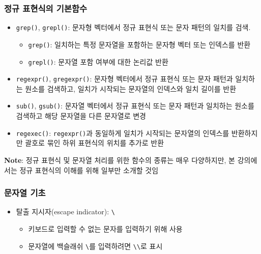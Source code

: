 \documentclass[
  11pt,
]{krantz}
\makeatletter
\providecommand{\tightlist}{%
  \setlength{\itemsep}{0pt}\setlength{\parskip}{0pt}}
\newenvironment{kframe}{%
\medskip{}
\setlength{\fboxsep}{.8em}
 \def\at@end@of@kframe{}%
 \ifinner\ifhmode%
  \def\at@end@of@kframe{\end{minipage}}%
  \begin{minipage}{\columnwidth}%
 \fi\fi%
 \def\FrameCommand##1{\hskip\@totalleftmargin \hskip-\fboxsep
 \colorbox{shadecolor}{##1}\hskip-\fboxsep
     \hskip-\linewidth \hskip-\@totalleftmargin \hskip\columnwidth}%
 \MakeFramed {\advance\hsize-\width
   \@totalleftmargin\z@ \linewidth\hsize
   \@setminipage}}%
 {\par\unskip\endMakeFramed%
 \at@end@of@kframe}
\renewenvironment{quote}{\begin{kframe}}{\end{kframe}}
\makeatother
\begin{document}
\hypertarget{regex-prim-fun}{%
\subsubsection*{정규 표현식의 기본함수}\label{regex-prim-fun}}


\begin{itemize}
\item
  \texttt{grep()}, \texttt{grepl()}: 문자형 벡터에서 정규 표현식 또는 문자 패턴의 일치를 검색.

  \begin{itemize}
  \tightlist
  \item
    \texttt{grep()}: 일치하는 특정 문자열을 포함하는 문자형 벡터 또는 인덱스를 반환
  \item
    \texttt{grepl()}: 문자열 포함 여부에 대한 논리값 반환
  \end{itemize}
\item
  \texttt{regexpr()}, \texttt{gregexpr()}: 문자형 벡터에서 정규 표현식 또는 문자 패턴과 일치하는 원소를 검색하고, 일치가 시작되는 문자열의 인덱스와 일치 길이를 반환
\item
  \texttt{sub()}, \texttt{gsub()}: 문자열 벡터에서 정규 표현식 또는 문자 패턴과 일치하는 원소를 검색하고 해당 문자열을 다른 문자열로 변경
\item
  \texttt{regexec()}: \texttt{regexpr()}과 동일하게 일치가 시작되는 문자열의 인덱스를 반환하지만 괄호로 묶인 하위 표현식의 위치를 추가로 반환
\end{itemize}

\begin{quote}
\textbf{Note}: 정규 표현식 및 문자열 처리를 위한 함수의 종류는 매우 다양하지만, 본 강의에서는 정규 표현식의 이해를 위해 일부만 소개할 것임
\end{quote}

\hypertarget{string-basic}{%
\subsubsection*{문자열 기초}\label{string-basic}}


\begin{itemize}
\tightlist
\item
  탈출 지시자(escape indicator): \texttt{\textbackslash{}}

  \begin{itemize}
  \tightlist
  \item
    키보드로 입력할 수 없는 문자를 입력하기 위해 사용
  \item
    문자열에 백슬래쉬 \texttt{\textbackslash{}}를 입력하려면 \texttt{\textbackslash{}\textbackslash{}}로 표시
  \end{itemize}
\end{itemize}
\end{document}
